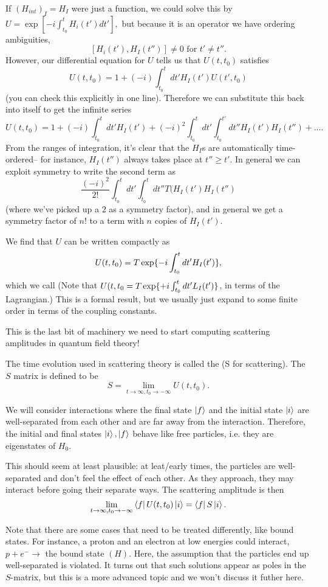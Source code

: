 If $(H_{int})_I=H_I$ were just a function, we could solve this by $U=\exp[-i \int_{t_0}^t H_i(t')dt'],$ but because it is an operator we have ordering ambiguities,
$$[H_i(t'),H_I(t'')]\neq 0 \text{ for }t'\neq t''.$$
However, our differential equation for $U$ tells us that $U(t,t_0)$ satisfies
$$U(t,t_0)=1+(-i)\int_{t_0}^t dt' H_I(t')U(t',t_0)$$
(you can check this explicitly in one line). Therefore we can substitute this back into itself to get the infinite series
$$U(t,t_0)=1+(-i)\int_{t_0}^t dt' H_I(t')+(-i)^2 \int_{t_0}^t dt' \int_{t_0}^{t'} dt'' H_I(t')H_I(t'')+\ldots.$$
From the ranges of integration, it's clear that the $H_I$s are automatically time-ordered-- for instance, $H_I(t'')$ always takes place at $t''\geq t'$. In general we can exploit symmetry to write the second term as
$$\frac{(-i)^2}{2!}\int_{t_0}^t dt' \int_{t_0}^t dt'' T(H_I(t')H_I(t'')$$ (where we've picked up a $2$ as a symmetry factor), and in general we get a symmetry factor of $n!$ to a term with $n$ copies of $H_I(t')$.
\begin{defn}
We find that $U$ can be written compactly as
$$U(t,t_0)=T \exp \{-i\int_{t_0}^t dt' H_I(t')\},$$
which we call  (Note that $U(t,t_0=T \exp \{+i\int_{t_0}^t dt' L_I(t')\}$, in terms of the Lagrangian.) This is a formal result, but we usually just expand to some finite order in terms of the coupling constants.
\end{defn}
This is the last bit of machinery we need to start computing scattering amplitudes in quantum field theory!

\begin{defn}
The time evolution used in scattering theory is called the  (S for scattering). The $S$ matrix is defined to be
$$S=\lim_{t\to \infty,t_0\to -\infty}U(t,t_0).$$
\end{defn}
We will consider interactions where the final state $\left| f \right>$ and the initial state $\left| i \right>$ are well-separated from each other and are far away from the interaction. Therefore, the initial and final states $\left| i \right>,\left| f \right>$ behave like free particles, i.e. they are eigenstates of $H_0$.

This should seem at least plausible: at leat/early times, the particles are well-separated and don't feel the effect of each other. As they approach, they may interact before going their separate ways. The scattering amplitude is then
$$\lim_{t\to\infty, t_0\to -\infty}\left< f \right|U(t,t_0)\left| i \right>=\left< f \right|S \left| i \right>.$$

Note that there are some cases that need to be treated differently, like bound states. For instance, a proton and an electron at low energies could interact, $p+e^-\to$ the bound state $(H)$. Here, the assumption that the particles end up well-separated is violated. It turns out that such solutions appear as poles in the $S$-matrix, but this is a more advanced topic and we won't discuss it futher here.

